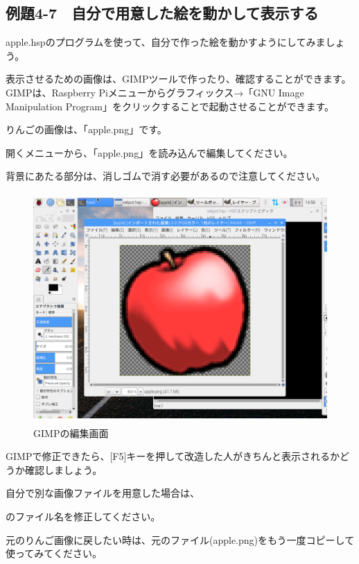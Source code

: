 \newpage
\subsection{例題4-7　自分で用意した絵を動かして表示する}


\begin{description}
    \item {}
\end{description}



apple.hspのプログラムを使って、自分で作った絵を動かすようにしてみましょう。

表示させるための画像は、GIMPツールで作ったり、確認することができます。GIMPは、Raspberry
Piメニューからグラフィックス→「GNU Image Manipulation Program」をクリックすることで起動させることができます。

りんごの画像は、「apple.png」です。

開くメニューから、「apple.png」を読み込んで編集してください。

背景にあたる部分は、消しゴムで消す必要があるので注意してください。


\begin{figure}[H]
    \begin{center}
      \includegraphics[keepaspectratio,width=11.712cm,height=8.784cm]{text04-img/text04-img021.png}
      \caption{GIMPの編集画面}
    \end{center}
    \label{fig:prog_menu}
\end{figure}

\begin{description}
    \item {}
\end{description}



GIMPで修正できたら、[F5]キーを押して改造した人がきちんと表示されるかどうか確認しましょう。

自分で別な画像ファイルを用意した場合は、

\begin{description}
    \item {}
\end{description}


のファイル名を修正してください。

元のりんご画像に戻したい時は、元のファイル(apple.png)をもう一度コピーして使ってみてください。





